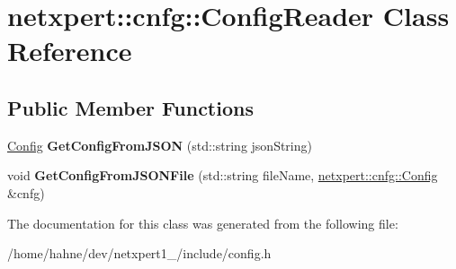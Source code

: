\hypertarget{classnetxpert_1_1cnfg_1_1ConfigReader}{}\section{netxpert\+:\+:cnfg\+:\+:Config\+Reader Class Reference}
\label{classnetxpert_1_1cnfg_1_1ConfigReader}
\subsection*{Public Member Functions}
\begin{DoxyCompactItemize}
\item 
\hyperlink{structnetxpert_1_1cnfg_1_1Config}{Config} {\bfseries Get\+Config\+From\+J\+S\+ON} (std\+::string json\+String)\hypertarget{classnetxpert_1_1cnfg_1_1ConfigReader_adb5756de4a36b951ef31e40f6ead49bc}{}\label{classnetxpert_1_1cnfg_1_1ConfigReader_adb5756de4a36b951ef31e40f6ead49bc}

\item 
void {\bfseries Get\+Config\+From\+J\+S\+O\+N\+File} (std\+::string file\+Name, \hyperlink{structnetxpert_1_1cnfg_1_1Config}{netxpert\+::cnfg\+::\+Config} \&cnfg)\hypertarget{classnetxpert_1_1cnfg_1_1ConfigReader_a3752b114bf9de7624eab789c37acdc0f}{}\label{classnetxpert_1_1cnfg_1_1ConfigReader_a3752b114bf9de7624eab789c37acdc0f}

\end{DoxyCompactItemize}


The documentation for this class was generated from the following file\+:\begin{DoxyCompactItemize}
\item 
/home/hahne/dev/netxpert1\+\_/include/config.\+h\end{DoxyCompactItemize}
